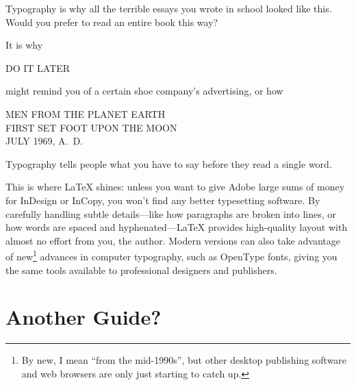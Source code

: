 \begin{adjustwidth}{2em}{0pt}
\fontsize{12pt}{24pt}\selectfont\raggedright
\noindent Typography is why all the terrible essays you wrote in school
looked like this.
Would you prefer to read an entire book this way?
\end{adjustwidth}
\bigskip

\noindent It is why

\bigskip
\begin{adjustwidth}{2em}{0pt}
\noindent{}\Large DO IT LATER
\end{adjustwidth}
\bigskip

\noindent might remind you of a certain shoe company's advertising,
or how

\begin{center}
\noindent MEN FROM THE PLANET EARTH \\
FIRST SET FOOT UPON THE MOON \\
JULY 1969, A.~D.
\end{center}

\noindent Typography tells people
what you have to say before they read a single word.

This is where \LaTeX{} shines: unless you want to give Adobe large sums
of money for InDesign or InCopy,
you won't find any better typesetting software.
By carefully handling subtle details---like how paragraphs are broken into lines,
or how words are spaced and hyphenated---\LaTeX{} provides high-quality layout
with almost no effort from you, the author.
Modern versions can also take advantage of new\footnote{By new,
I mean ``from the mid-1990s''\quotekern, but other desktop publishing software and web
browsers are only just starting to catch up.} advances in computer typography,
such as OpenType fonts, giving you the same tools available to professional
designers and publishers.

\chapter{Another Guide?}
